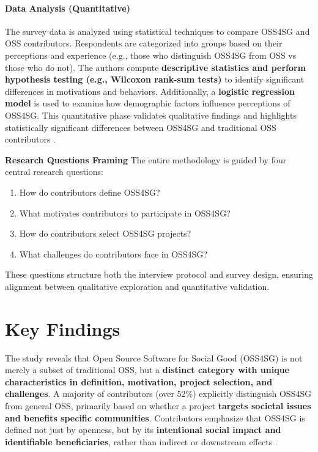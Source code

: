 \paragraph{Data Analysis (Quantitative)}
The survey data is analyzed using statistical techniques to compare OSS4SG and OSS contributors. Respondents are categorized into groups based on their perceptions and experience (e.g., those who distinguish OSS4SG from OSS vs those who do not). The authors compute \textbf{descriptive statistics and perform hypothesis testing (e.g., Wilcoxon rank-sum tests)} to identify significant differences in motivations and behaviors. Additionally, a \textbf{logistic regression model} is used to examine how demographic factors influence perceptions of OSS4SG. This quantitative phase validates qualitative findings and highlights statistically significant differences between OSS4SG and traditional OSS contributors .

\textbf{Research Questions Framing}
The entire methodology is guided by four central research questions:
\begin{enumerate}[label=\textbf{RQ\arabic*},leftmargin=*]
    \item How do contributors define OSS4SG?
    \item What motivates contributors to participate in OSS4SG?
    \item How do contributors select OSS4SG projects?
    \item What challenges do contributors face in OSS4SG?
\end{enumerate}
These questions structure both the interview protocol and survey design, ensuring alignment between qualitative exploration and quantitative validation.

\section{Key Findings}
The study reveals that Open Source Software for Social Good (OSS4SG) is not merely a subset of traditional OSS, but a \textbf{distinct category with unique characteristics in definition, motivation, project selection, and challenges}. A majority of contributors (over 52\%) explicitly distinguish OSS4SG from general OSS, primarily based on whether a project \textbf{targets societal issues and benefits specific communities}. Contributors emphasize that OSS4SG is defined not just by openness, but by its \textbf{intentional social impact and identifiable beneficiaries}, rather than indirect or downstream effects .

